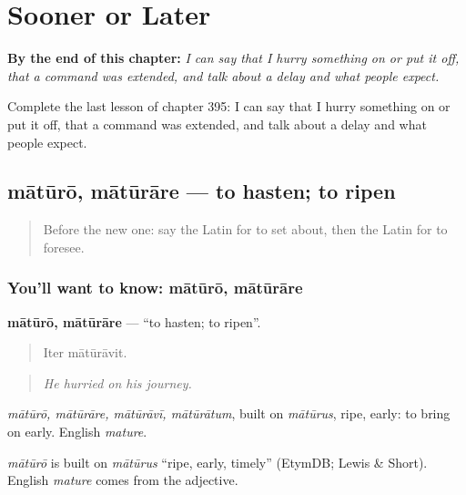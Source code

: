 
\chapter{Sooner or Later}
\label{ch:la-sooner-or-later}

\begin{chapteropening}
\textbf{By the end of this chapter:} \emph{I can say that I hurry something on or put it off, that a command was extended, and talk about a delay and what people expect.}

Complete the last lesson of chapter 395: I can say that I hurry something on or put it off, that a command was extended, and talk about a delay and what people expect.
\end{chapteropening}

\section[mātūrō, mātūrāre]{mātūrō, mātūrāre — to hasten; to ripen}

\label{lesson:LA-C395-maturo}



\begin{quote}
Before the new one: say the Latin for to set about, then the Latin for to foresee.
\end{quote}

\subsection*{You'll want to know: mātūrō, mātūrāre}
\textbf{mātūrō, mātūrāre} — \textquotedblleft{}to hasten; to ripen\textquotedblright{}.

\begin{quote}
Iter mātūrāvit.
\end{quote}

\begin{quote}
\emph{He hurried on his journey.}
\end{quote}

\emph{mātūrō, mātūrāre, mātūrāvī, mātūrātum}, built on \emph{mātūrus}, ripe, early: to bring on early. English \emph{mature}.

\begin{cousinweb}
\emph{mātūrō} is built on \emph{mātūrus} \textquotedblleft{}ripe, early, timely\textquotedblright{} (EtymDB; Lewis \& Short). English \emph{mature} comes from the adjective.
\end{cousinweb}

